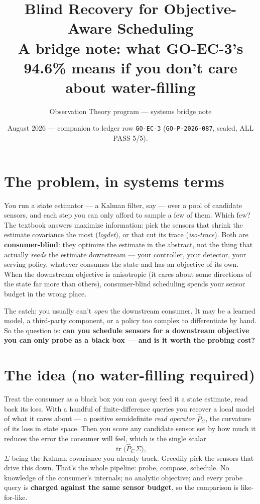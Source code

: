 \documentclass[11pt]{article}
\title{\textbf{Blind Recovery for Objective-Aware Scheduling}\\[2pt]
\large A bridge note: what GO-EC-3's 94.6\% means if you don't care
about water-filling}
\author{Observation Theory program --- systems bridge note}
\date{August 2026 --- companion to ledger row \texttt{GO-EC-3}
(\texttt{GO-P-2026-087}, sealed, ALL PASS 5/5).}
\newcommand{\tr}{\operatorname{tr}}
\begin{document}
\maketitle

\section*{The problem, in systems terms}

You run a state estimator --- a Kalman filter, say --- over a pool of
candidate sensors, and each step you can only afford to sample a few of
them. Which few? The textbook answers maximize information: pick the
sensors that shrink the estimate covariance the most (\emph{logdet}), or
that cut its trace (\emph{iso-trace}). Both are \textbf{consumer-blind}:
they optimize the estimate in the abstract, not the thing that actually
\emph{reads} the estimate downstream --- your controller, your detector,
your serving policy, whatever consumes the state and has an objective of
its own. When the downstream objective is anisotropic (it cares about
some directions of the state far more than others), consumer-blind
scheduling spends your sensor budget in the wrong place.

The catch: you usually can't \emph{open} the downstream consumer. It may
be a learned model, a third-party component, or a policy too complex to
differentiate by hand. So the question is: \textbf{can you schedule
sensors for a downstream objective you can only probe as a black box ---
and is it worth the probing cost?}

\section*{The idea (no water-filling required)}

Treat the consumer as a black box you can \emph{query}: feed it a state
estimate, read back its loss. With a handful of finite-difference queries
you recover a local model of what it cares about --- a positive
semidefinite \emph{read operator} $\hat P_C$, the curvature of its loss
in state space. Then you score any candidate sensor set by how much it
reduces the error the consumer will feel, which is the single scalar
\[
  \tr\!\big(\hat P_C\,\Sigma\big),
\]
$\Sigma$ being the Kalman covariance you already track. Greedily pick the
sensors that drive this down. That's the whole pipeline: probe, compose,
schedule. No knowledge of the consumer's internals; no analytic
objective; and every probe query is \textbf{charged
against the same sensor budget}, so the comparison is like-for-like.
\end{document}
